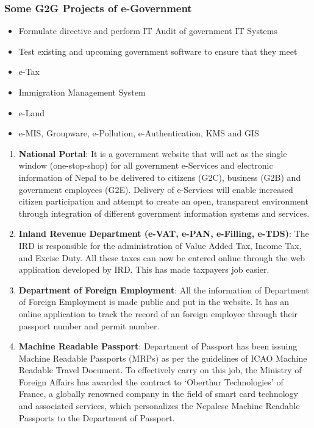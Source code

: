 \subsubsection*{Some G2G Projects of e-Government}
\begin{itemize}
	\item Formulate directive and perform IT Audit of government IT Systems
	\item Test  existing and upcoming government software to ensure that they meet
	\item e-Tax
	\item Immigration Management System
	\item e-Land
	\item e-MIS, Groupware, e-Pollution, e-Authentication, KMS and GIS
\end{itemize}
\begin{enumerate}
	\item \textbf{National Portal}:
	It is a government website that will act as the single window (one-stop-shop) for all government e-Services and electronic information of Nepal to be delivered to citizens (G2C), business (G2B) and government employees (G2E). Delivery of e-Services will enable increased citizen participation and attempt to create an open, transparent environment through integration of different government information systems and services.
	
	\item \textbf{Inland Revenue Department (e-VAT, e-PAN, e-Filling, e-TDS)}:
	The IRD is responsible for the administration of Value Added Tax, Income Tax, and Excise Duty. All these taxes can now be entered online through the web application developed by IRD. This has made taxpayers job easier.
	
	\item \textbf{Department of Foreign Employment}:
	All the information of Department of Foreign Employment is made public and put in the website. It has an online application to track the record of an foreign employee through their passport number and permit number. 
	
	\item \textbf{Machine Readable Passport}: 
	 Department of Passport has been issuing Machine Readable Passports (MRPs) as per the guidelines of ICAO Machine Readable Travel Document. To effectively carry on this job, the Ministry of Foreign Affairs has awarded the contract to `Oberthur Technologies' of France, a globally renowned company in the field of smart card technology and associated services, which personalizes the Nepalese Machine Readable Passports to the Department of Passport. 
	 

\end{enumerate}
